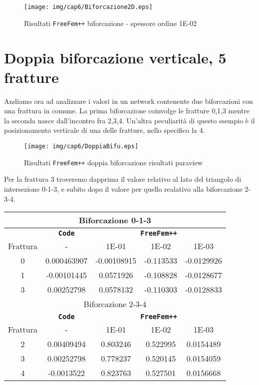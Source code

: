 \begin{figure}[h!]
\centering
\texttt{[image: img/cap6/Biforcazione2D.eps]}
\caption{Risultati \texttt{FreeFem++} biforcazione - spessore ordine 1E-02 }\label{Biforcazione1E-02}
\end{figure}

\section{Doppia biforcazione verticale, 5 fratture}
Andiamo ora ad analizzare i valori in un network contenente due biforcazioni con una frattura in comune.
La prima biforcazione coinvolge le fratture 0,1,3 mentre la seconda nasce dall'incontro fra 2,3,4.
Un'altra peculiarità di questo esempio è il posizionamento verticale di una delle fratture, nello specifico la 4.\\
\begin{figure}[h!]
\centering
\texttt{[image: img/cap6/DoppiaBifu.eps]}
\caption{Risultati \texttt{FreeFem++} doppia biforcazione risultati paraview }\label{DoppiaBifuVerticalParaview}
\end{figure}

Per la frattura 3 troveremo dapprima il valore relativo al lato del triangolo di intersezione 0-1-3, e subito dopo il valore per quello realativo alla biforcazione 2-3-4.

\begin{center}
\begin{tabular}{|c|c|c|c|c|}
\hline
\multicolumn{5}{|c|}{Biforcazione 0-1-3}\\
\hline
 & \textbf{\texttt{Code}} & \multicolumn{3}{|c|}{\textbf{\texttt{FreeFem++}}} \\
\hline
\multicolumn{1}{|c|}{Frattura} & - &
\multicolumn{1}{|c|}{1E-01} & 1E-02 & 1E-03 \\
\hline
 0 & 0.000463907 & -0.00108915 & -0.113533 & -0.0129926\\
 1 & -0.00101445 & 0.0571926 & -0.108828 & -0.0128677\\  
 3 & 0.00252798 & 0.0578132 & -0.110303 & -0.0128833\\
\hline
\multicolumn{5}{|c|}{Biforcazione 2-3-4}\\
\hline
 & \textbf{\texttt{Code}} & \multicolumn{3}{|c|}{\textbf{\texttt{FreeFem++}}} \\
\hline
\multicolumn{1}{|c|}{Frattura} & - &
\multicolumn{1}{|c|}{1E-01} & 1E-02 & 1E-03 \\
\hline
 2 & 0.00409494 & 0.803246 & 0.522995 & 0.0154489\\ 
 3 & 0.00252798 & 0.778237 & 0.520145 & 0.0154059\\
 4 & -0.0013522 & 0.823763 & 0.527501 & 0.0156668\\
\hline
\end{tabular}
\end{center}

